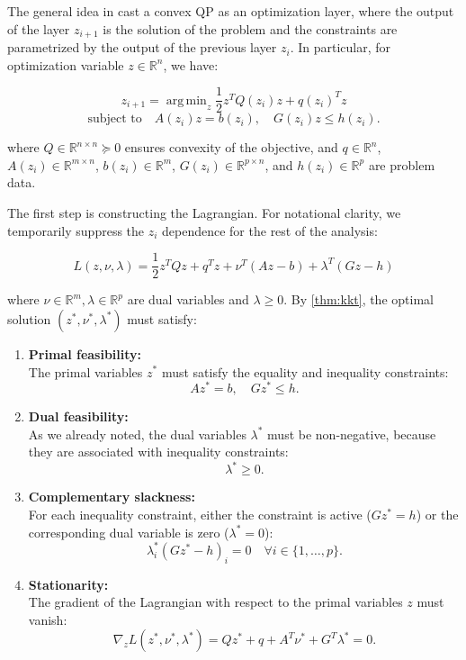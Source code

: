 \documentclass{article}
\DeclareMathOperator*{\argmin}{arg\,min}
\begin{document}
The general idea in \citet{optnet} cast a convex QP as an optimization layer, where the output of the layer $z_{i+1}$ is the solution of the problem and the constraints are parametrized by the output of the previous layer $z_i$. In particular, for optimization variable $z \in \mathbb{R}^n$, we have: 

\[
z_{i+1} = \argmin_{z} \frac{1}{2} z^T Q(z_i) z + q(z_i)^T z
\]
\[
\text{subject to} \quad A(z_i) z = b(z_i), \quad G(z_i) z \leq h(z_i).
\]

where \( Q \in \mathbb{R}^{n \times n} \succeq 0 \) ensures convexity of the objective, and \( q \in \mathbb{R}^n \), 
\( A(z_i) \in \mathbb{R}^{m \times n} \), \( b(z_i) \in \mathbb{R}^m \), \( G(z_i) \in \mathbb{R}^{p \times n} \), and \( h(z_i) \in \mathbb{R}^p \) are problem data. 

The first step is constructing the Lagrangian. For notational clarity, we temporarily suppress the $z_i$ dependence for the rest of the analysis:

\[
L(z,\nu,\lambda) = \frac{1}{2}z^T Q z + q^T z + \nu^T(Az - b) + \lambda^T(Gz - h)
\]

where $\nu \in \mathbb{R}^m, \lambda \in \mathbb{R}^p$ are dual variables and $\lambda \geq 0$. By \ref{thm:kkt}, the optimal solution $(z^*, \nu^*, \lambda^*)$ must satisfy: 

\begin{enumerate}
    \item \textbf{Primal feasibility:} \\
    The primal variables $z^*$ must satisfy the equality and inequality constraints:
    \[
    Az^* = b, \quad Gz^* \leq h.
    \]

    \item \textbf{Dual feasibility:} \\
    As we already noted, the dual variables $\lambda^*$ must be non-negative, because they are associated with inequality constraints:
    \[
    \lambda^* \geq 0.
    \]

    \item \textbf{Complementary slackness:} \\
    For each inequality constraint, either the constraint is active ($Gz^* = h$) or the corresponding dual variable is zero ($\lambda^* = 0$):
    \[
    \lambda_i^* (Gz^* - h)_i = 0 \quad \forall i \in \{1, \ldots, p\}.
    \]

    \item \textbf{Stationarity:} \\
    The gradient of the Lagrangian with respect to the primal variables $z$ must vanish:
    \[
    \nabla_z L(z^*, \nu^*, \lambda^*) = Qz^* + q + A^T\nu^* + G^T\lambda^* = 0.
    \]
\end{enumerate}
\end{document}
